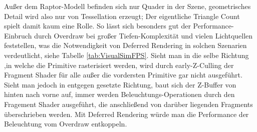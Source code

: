 	
	Außer dem Raptor-Modell befinden sich nur Quader in der Szene, geometrisches Detail wird also
	nur von Tessellation erzeugt; Der eigentliche Triangle Count spielt damit kaum eine Rolle.
	So lässt sich besonders gut der Performance-Einbruch durch Overdraw bei großer Tiefen-Komplexität und vielen
	Lichtquellen feststellen, was die Notwendigkeit von Deferred Rendering in solchen Szenarien verdeutlicht,
	siehe Tabelle \ref{tab:VisualSimFPS}. Sieht man in die selbe Richtung ,in welche die Primitive rasterisiert werden,
	wird durch early-Z-Culling der Fragment Shader für alle außer die vordersten Primitive gar nicht ausgeführt.
	Sieht man jedoch in entgegen gesetzte Richtung, baut sich der Z-Buffer von hinten nach vorne auf, immer werden 
	Beleuchtungs-Operationen durch den Fragement Shader ausgeführt, die anschließend von darüber liegenden
	Fragments überschrieben werden. Mit Deferred Rendering würde man die Performance der Beleuchtung 
	vom Overdraw entkoppeln.
	


